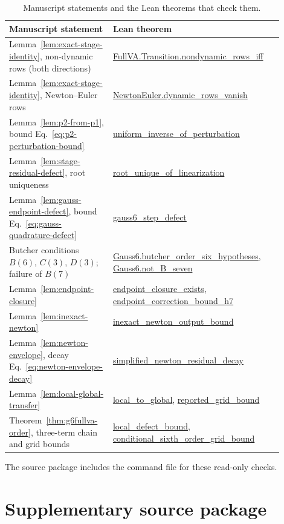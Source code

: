 \documentclass[preprint,12pt]{elsarticle}
\providecommand{\nolinkurl}[1]{\url{#1}}
\begin{document}
\begin{table}[htbp]
\centering
\caption{Manuscript statements and the Lean theorems that check them.}
\label{tab:lean-development}
\footnotesize
\setlength{\tabcolsep}{4pt}
\begin{tabular}{P{0.34\linewidth}P{0.56\linewidth}}
\toprule
Manuscript statement & Lean theorem \\
\midrule
Lemma~\ref{lem:exact-stage-identity}, non-dynamic rows (both directions) &
\nolinkurl{FullVA.Transition.nondynamic_rows_iff} \\
Lemma~\ref{lem:exact-stage-identity}, Newton--Euler rows &
\nolinkurl{NewtonEuler.dynamic_rows_vanish} \\
Lemma~\ref{lem:p2-from-p1}, bound Eq.~\eqref{eq:p2-perturbation-bound} &
\nolinkurl{uniform_inverse_of_perturbation} \\
Lemma~\ref{lem:stage-residual-defect}, root uniqueness &
\nolinkurl{root_unique_of_linearization} \\
Lemma~\ref{lem:gauss-endpoint-defect}, bound Eq.~\eqref{eq:gauss-quadrature-defect} &
\nolinkurl{gauss6_step_defect} \\
Butcher conditions $B(6)$, $C(3)$, $D(3)$; failure of $B(7)$ &
\nolinkurl{Gauss6.butcher_order_six_hypotheses}, \nolinkurl{Gauss6.not_B_seven} \\
Lemma~\ref{lem:endpoint-closure} &
\nolinkurl{endpoint_closure_exists}, \nolinkurl{endpoint_correction_bound_h7} \\
Lemma~\ref{lem:inexact-newton} &
\nolinkurl{inexact_newton_output_bound} \\
Lemma~\ref{lem:newton-envelope}, decay Eq.~\eqref{eq:newton-envelope-decay} &
\nolinkurl{simplified_newton_residual_decay} \\
Lemma~\ref{lem:local-global-transfer} &
\nolinkurl{local_to_global}, \nolinkurl{reported_grid_bound} \\
Theorem~\ref{thm:g6fullva-order}, three-term chain and grid bounds &
\nolinkurl{local_defect_bound}, \nolinkurl{conditional_sixth_order_grid_bound} \\
\bottomrule
\end{tabular}
\end{table}

The source package includes the command file for these read-only checks.

\section{Supplementary source package}
\end{document}
